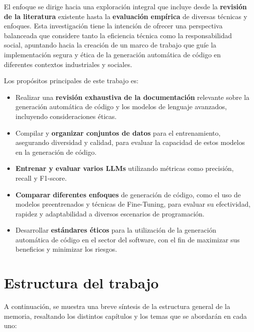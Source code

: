 \bigskip %

El enfoque se dirige hacia una exploración integral que incluye desde la \textbf{revisión de la literatura} existente hasta la \textbf{evaluación empírica} de diversas técnicas y enfoques. Esta investigación tiene la intención de ofrecer una perspectiva balanceada que considere tanto la eficiencia técnica como la responsabilidad social, apuntando hacia la creación de un marco de trabajo que guíe la implementación segura y ética de la generación automática de código en diferentes contextos industriales y sociales.

\bigskip %

Los propósitos principales de este trabajo es:

\begin{itemize}
\item Realizar una \textbf{revisión exhaustiva de la documentación} relevante sobre la generación automática de código y los modelos de lenguaje avanzados, incluyendo consideraciones éticas.
\item Compilar y \textbf{organizar conjuntos de datos} para el entrenamiento, asegurando diversidad y calidad, para evaluar la capacidad de estos modelos en la generación de código.
\item \textbf{Entrenar y evaluar varios \acrlong{LLMs} }utilizando métricas como precisión, recall y F1-score.
\item \textbf{Comparar diferentes enfoques}  de generación de código, como el uso de modelos preentrenados y técnicas de Fine-Tuning, para evaluar su efectividad, rapidez y adaptabilidad a diversos escenarios de programación.
\item Desarrollar \textbf{estándares éticos} para la utilización de la generación automática de código en el sector del software, con el fin de maximizar sus beneficios y minimizar los riesgos.
\end{itemize}

\bigskip %

\section{Estructura del trabajo}

A continuación, se muestra una breve síntesis de la estructura general de la memoria, resaltando los distintos capítulos y los temas que se abordarán en cada uno:

